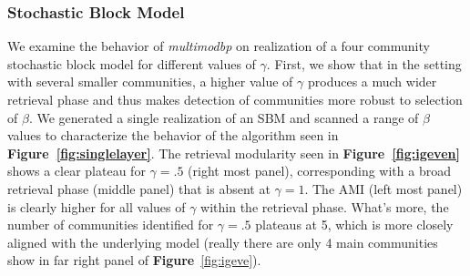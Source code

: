 \documentclass[11pt]{article}
\begin{document}
\subsubsection{Stochastic Block Model}
We examine the behavior of \textit{multimodbp} on realization of a four community stochastic block model for different values of $\gamma$.  First, we show that in the setting with several smaller communities, a higher value of $\gamma$ produces a much wider retrieval phase and thus makes detection of communities more robust to selection of $\beta$.  We generated a single realization of an SBM and scanned a range of $\beta$ values to characterize the behavior of the algorithm seen in \textbf{Figure~\ref{fig:singlelayer}}.  The retrieval modularity seen in \textbf{Figure~\ref{fig:igeven}} shows a clear plateau for $\gamma=.5$ (right most panel), corresponding with a broad retrieval phase (middle panel) that is absent at $\gamma=1$.  The AMI (left most panel) is clearly higher for all values of $\gamma$ within the retrieval phase.  What's more, the number of communities identified for $\gamma=.5$ plateaus at 5, which is more closely aligned with the underlying model (really there are only 4 main communities show in far right panel of \textbf{Figure}~\ref{fig:igeve}).   
\end{document}
